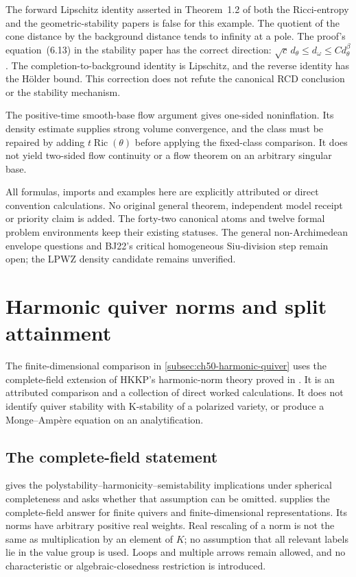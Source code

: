 The forward Lipschitz identity asserted in Theorem~1.2
of both the Ricci-entropy and the geometric-stability
papers is false for this example. The quotient of the
cone distance by the background distance tends to infinity
at a pole. The proof's equation~(6.13) in the stability
paper has the correct direction:
\(\sqrt c\,d_\theta\leq d_\omega\leq C d_\theta^\beta\).
The completion-to-background identity is Lipschitz, and
the reverse identity has the H\"older bound. This correction
does not refute the canonical RCD conclusion or the
stability mechanism.

The positive-time smooth-base flow argument gives one-sided
noninflation. Its density estimate supplies strong volume
convergence, and the class must be repaired by adding
\(t\operatorname{Ric}(\theta)\) before applying the
fixed-class comparison. It does not yield two-sided flow
continuity or a flow theorem on an arbitrary singular base.

All formulas, imports and examples here are explicitly
attributed or direct convention calculations. No original
general theorem, independent model receipt or priority
claim is added. The forty-two canonical atoms and twelve
formal problem environments keep their existing statuses.
The general non-Archimedean envelope questions and BJ22's
critical homogeneous Siu-division step remain open; the
LPWZ density candidate remains unverified.

\section{Harmonic quiver norms and split attainment}
\label{sec:appL-harmonic-quiver}

The finite-dimensional comparison in
\cref{subsec:ch50-harmonic-quiver} uses the complete-field extension of
HKKP's harmonic-norm theory proved in \cite{BB26HarmonicQuiverV1}.
It is an attributed comparison and a collection of direct worked
calculations. It does not identify quiver stability with K-stability
of a polarized variety, or produce a Monge--Amp\`ere equation on
an analytification.

\subsection{The complete-field statement}

\cite[Theorem~6.23 and Question~6.24]{HKKP26CategoricalV1} gives the
polystability--harmonicity--semistability implications under spherical
completeness and asks whether that assumption can be omitted.
\cite[Theorem~1.1]{BB26HarmonicQuiverV1} supplies the complete-field
answer for finite quivers and finite-dimensional representations.
Its norms have arbitrary positive real weights. Real rescaling of
a norm is not the same as multiplication by an element of $K$;
no assumption that all relevant labels lie in the value group is used.
Loops and multiple arrows remain allowed, and no characteristic or
algebraic-closedness restriction is introduced.

